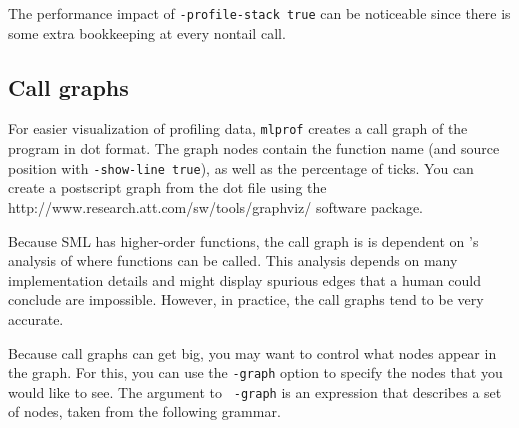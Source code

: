 The performance impact of {\tt -profile-stack true} can be noticeable
since there is some extra bookkeeping at every nontail call.

\subsection{Call graphs}

For easier visualization of profiling data, {\tt mlprof} creates a
call graph of the program in dot format.  The graph nodes contain the
function name (and source position with {\tt -show-line true}), as
well as the percentage of ticks.  You can create a postscript graph
from the dot file using the
		  {http://www.research.att.com/sw/tools/graphviz/}
software package.

Because SML has higher-order functions, the call graph is is dependent
on {\mlton}'s analysis of where functions can be called.  This
analysis depends on many implementation details and might display
spurious edges that a human could conclude are impossible.  However,
in practice, the call graphs tend to be very accurate.

Because call graphs can get big, you may want to control what nodes
appear in the graph.  For this, you can use the {\tt -graph} option to
specify the nodes that you would like to see.  The argument to {\tt
-graph} is an expression that describes a set of nodes, taken from the
following grammar.

